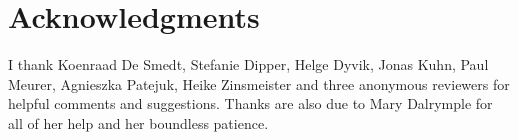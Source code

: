 \documentclass[output=paper,hidelinks]{langscibook}
\begin{document}
\section*{Acknowledgments}

I thank Koenraad De Smedt, Stefanie Dipper, Helge Dyvik, Jonas Kuhn, Paul Meurer, Agnieszka Patejuk, Heike Zinsmeister and three anonymous reviewers for helpful comments and suggestions.
Thanks are also due to Mary Dalrymple for all of her help and her boundless patience.
  
\sloppy
\printbibliography[heading=subbibliography,notkeyword=this]
\end{document}
